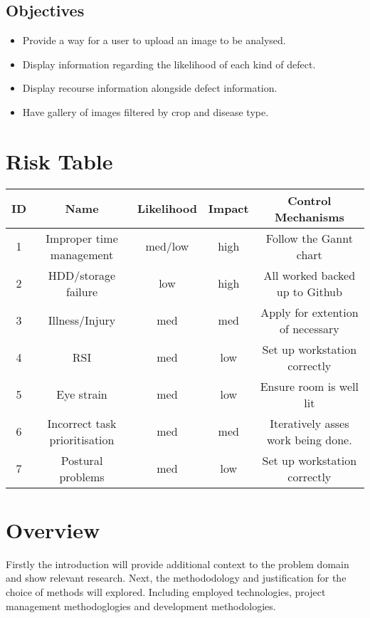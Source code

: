   \subsection{Objectives}
    \begin{itemize}
      \item Provide a way for a user to upload an image to be analysed.
      \item Display information regarding the likelihood of each kind of defect.
      \item Display recourse information alongside defect information.
      \item Have gallery of images filtered by crop and disease type.
    \end{itemize}

  \section{Risk Table}
  \begin{tabular}{|c|c|c|c|c|}
  \hline
  ID & Name & Likelihood & Impact & Control Mechanisms\tabularnewline
  \hline
  \hline
  1 & Improper time management & med/low & high & Follow the Gannt chart\tabularnewline
  \hline
  2 & HDD/storage failure & low & high & All worked backed up to Github\tabularnewline
  \hline
  3 & Illness/Injury & med & med & Apply for extention of necessary\tabularnewline
  \hline
  4 & RSI & med & low & Set up workstation correctly\tabularnewline
  \hline
  5 & Eye strain & med & low & Ensure room is well lit\tabularnewline
  \hline
  6 & Incorrect task prioritisation & med & med & Iteratively asses work being done.\tabularnewline
  \hline
  7 & Postural problems & med & low & Set up workstation correctly\tabularnewline
  \hline
  \end{tabular}


\section{Overview}
  Firstly the introduction will provide additional context to the problem domain and show relevant research. Next, the methododology and justification for the choice of methods will explored. Including employed technologies, project management methodoglogies and development methodologies.
